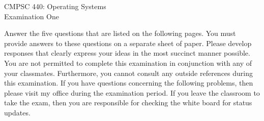 \documentclass[12pt,epsf,psfig,graphics]{article}
\def\widow#1{\vskip #1\vbadness10000\penalty-200\vskip-#1}
\begin{document}

\def\widow#1{\vskip #1\vbadness10000\penalty-200\vskip-#1}

\begin{center}

CMPSC 440: Operating Systems\\
Examination One\\

\end{center}

\noindent
Answer the five questions that are listed on the following pages.  You must provide answers to these questions on a
separate sheet of paper.  Please develop responses that clearly express your ideas in the most succinct manner possible.
You are not permitted to complete this examination in conjunction with any of your classmates.  Furthermore, you cannot
consult any outside references during this examination.  If you have questions concerning the following problems, then
please visit my office during the examination period.  If you leave the classroom to take the exam, then you are
responsible for checking the white board for status updates.

\end{document}
